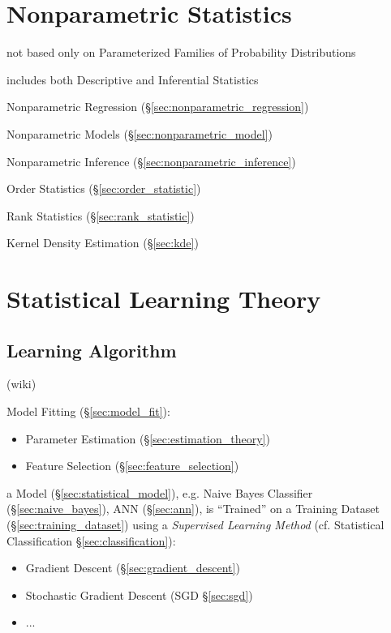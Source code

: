 \section{Nonparametric Statistics}\label{sec:nonparametric_statistics}

not based only on Parameterized Families of Probability Distributions

includes both Descriptive and Inferential Statistics

Nonparametric Regression (\S\ref{sec:nonparametric_regression})

Nonparametric Models (\S\ref{sec:nonparametric_model})

Nonparametric Inference (\S\ref{sec:nonparametric_inference})

Order Statistics (\S\ref{sec:order_statistic})

Rank Statistics (\S\ref{sec:rank_statistic})

Kernel Density Estimation (\S\ref{sec:kde})



\section{Statistical Learning Theory}\label{sec:statistical_learning_theory}

\subsection{Learning Algorithm}\label{sec:learning_algorithm}

(wiki)

Model Fitting (\S\ref{sec:model_fit}):
\begin{itemize}
  \item Parameter Estimation (\S\ref{sec:estimation_theory})
  \item Feature Selection (\S\ref{sec:feature_selection})
\end{itemize}

a Model (\S\ref{sec:statistical_model}), e.g. Naive Bayes Classifier
(\S\ref{sec:naive_bayes}), ANN (\S\ref{sec:ann}), is ``Trained'' on a Training
Dataset (\S\ref{sec:training_dataset}) using a \emph{Supervised Learning Method}
(cf. Statistical Classification \S\ref{sec:classification}):
\begin{itemize}
  \item Gradient Descent (\S\ref{sec:gradient_descent})
  \item Stochastic Gradient Descent (SGD \S\ref{sec:sgd})
  \item ...
\end{itemize}

